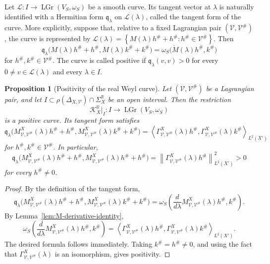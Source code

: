 \documentclass[12pt]{amsart}
\theoremstyle{plain}
\newtheorem{prop}[thm]{Proposition}
\theoremstyle{definition}
\theoremstyle{remark}
\numberwithin{equation}{section} \numberwithin{figure}{section}
\renewcommand*{\to}{\rightarrow}
\newcommand{\mb}[1]{\mathbb{#1}} %
\newcommand{\mc}[1]{\mathcal{#1}}
\begin{document}
Let
\(
    \mc L:I\to\operatorname{LGr}(V_S,\omega_S)
\)
be a smooth curve. Its tangent vector at \(\lambda\) is naturally
identified with a Hermitian form
\(\mathfrak q_\lambda\) on \(\mc L(\lambda)\), called the tangent form
of the curve. More explicitly, suppose that, relative to a fixed
Lagrangian pair \((\mc V,\mc V^\#)\), the curve is represented by
\(
    \mc L(\lambda)
    =
    \left\{
        M(\lambda)h^\#+h^\#:
        h^\#\in\mc V^\#
    \right\}.
\)
Then
\[
    \mathfrak q_\lambda\bigl(
        M(\lambda)h^\#+h^\#,
        M(\lambda)k^\#+k^\#
    \bigr)
    =
    \omega_S\bigl(
        \dot M(\lambda)h^\#,
        k^\#
    \bigr)
\]
for \(h^\#,k^\#\in\mc V^\#\). The curve is called positive if
\(\mathfrak q_\lambda(v,v)>0\) for every
\(0\neq v\in\mc L(\lambda)\) and every \(\lambda\in I\).

\begin{prop}[Positivity of the real Weyl curve]
\label{prop:positive-weyl-curve}
Let \((\mc V,\mc V^\#)\) be a Lagrangian pair, and let
\(I\subset\rho(\Delta_{X,\mc V})\cap\Sigma_X^{\mb R}\) be an open
interval. Then the restriction
\[
    \mc K_X^{\mb R}|_I:
    I
    \longrightarrow
    \operatorname{LGr}(V_S,\omega_S)
\]
is a positive curve. Its tangent form satisfies
\[
\mathfrak q_\lambda\bigl(
    M_{\mc V,\mc V^\#}^X(\lambda)h^\#+h^\#,
    M_{\mc V,\mc V^\#}^X(\lambda)k^\#+k^\#
\bigr)
=
\left\langle
    \Gamma_{\mc V,\mc V^\#}^X(\lambda)h^\#,
    \Gamma_{\mc V,\mc V^\#}^X(\lambda)k^\#
\right\rangle_{L^2(X')}
\]
for \(h^\#,k^\#\in\mc V^\#\). In particular,
\[
\mathfrak q_\lambda\bigl(
    M_{\mc V,\mc V^\#}^X(\lambda)h^\#+h^\#,
    M_{\mc V,\mc V^\#}^X(\lambda)h^\#+h^\#
\bigr)
=
\left\|
    \Gamma_{\mc V,\mc V^\#}^X(\lambda)h^\#
\right\|_{L^2(X')}^2
>0
\]
for every \(h^\#\neq0\).
\end{prop}

\begin{proof}
By the definition of the tangent form,
\[
\mathfrak q_\lambda\bigl(
    M_{\mc V,\mc V^\#}^X(\lambda)h^\#+h^\#,
    M_{\mc V,\mc V^\#}^X(\lambda)k^\#+k^\#
\bigr)
=
\omega_S\!\left(
    \frac{d}{d\lambda}
    M_{\mc V,\mc V^\#}^X(\lambda)h^\#,
    k^\#
\right).
\]
By Lemma~\ref{lem:M-derivative-identity},
\[
\omega_S\!\left(
    \frac{d}{d\lambda}
    M_{\mc V,\mc V^\#}^X(\lambda)h^\#,
    k^\#
\right)
=
\left\langle
    \Gamma_{\mc V,\mc V^\#}^X(\lambda)h^\#,
    \Gamma_{\mc V,\mc V^\#}^X(\lambda)k^\#
\right\rangle_{L^2(X')}.
\]
The desired formula follows immediately. Taking
\(k^\#=h^\#\neq0\), and using the fact that
\(\Gamma_{\mc V,\mc V^\#}^X(\lambda)\) is an isomorphism, gives
positivity.
\end{proof}
\end{document}
